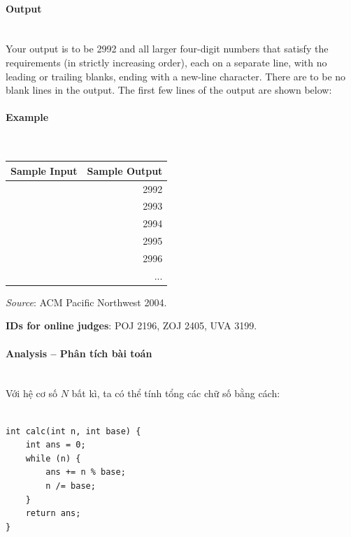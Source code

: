 \documentclass{article}
\begin{document}
\paragraph{Output}\mbox{} \\

Your output is to be 2992 and all larger four-digit numbers that satisfy the requirements (in strictly increasing order), each on a separate line, with no leading or trailing blanks, ending with a new-line character. There are to be no blank lines in the output. The first few lines of the output are shown below:

\paragraph{Example}\mbox{} \\

\begin{table}[h]
    \centering
    \begin{tabular}{|l|r|}
        \hline
        \textbf{Sample Input} & \textbf{Sample Output} \\
        \hline
            & 2992  \\ 
            & 2993 \\ 
            & 2994 \\ 
            & 2995 \\ 
            & 2996\\ 
            & ... \\ \hline
    \end{tabular}
\end{table}

\textit{Source}: ACM Pacific Northwest 2004.

\textbf{IDs for online judges}: POJ 2196, ZOJ 2405, UVA
3199.


\paragraph{Analysis -- Phân tích bài toán} \mbox{} \\

Với hệ cơ số $N$ bất kì, ta có thể tính tổng các chữ số bằng cách: \\

\begin{lstlisting}

int calc(int n, int base) {
	int ans = 0;
	while (n) {
		ans += n % base;
		n /= base;
	}
	return ans;
}

\end{lstlisting}
\end{document}
